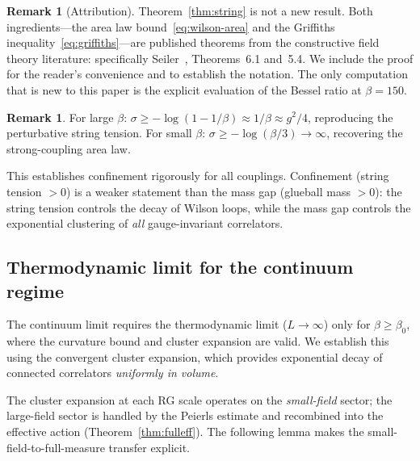 \documentclass[11pt]{article}
\theoremstyle{definition}
\newtheorem{remark}[theorem]{Remark}
\begin{document}
\begin{remark}[Attribution]
Theorem~\ref{thm:string} is not a new result.  Both
ingredients---the area law bound~\eqref{eq:wilson-area} and the
Griffiths inequality~\eqref{eq:griffiths}---are published
theorems from the constructive field theory literature:
specifically Seiler~\cite{Seiler82}, Theorems~6.1 and~5.4.
We include the proof for the reader's convenience and to
establish the notation.  The only computation that is new to
this paper is the explicit evaluation of the Bessel ratio at
$\beta=150$.
\end{remark}

\begin{remark}
For large $\beta$: $\sigma\ge-\log(1-1/\beta)\approx 1/\beta\approx
g^2/4$, reproducing the perturbative string tension.  For small $\beta$:
$\sigma\ge-\log(\beta/3)\to\infty$, recovering the strong-coupling area
law.
\end{remark}

This establishes confinement rigorously for all couplings.  Confinement
(string tension $>0$) is a weaker statement than the mass gap (glueball
mass $>0$): the string tension controls the decay of Wilson loops, while
the mass gap controls the exponential clustering of \emph{all}
gauge-invariant correlators.

\subsection{Thermodynamic limit for the continuum regime}

The continuum limit requires the thermodynamic limit ($L\to\infty$)
only for $\beta\ge\beta_0$, where the curvature bound and cluster
expansion are valid.  We establish this using the convergent
cluster expansion, which provides exponential decay of connected
correlators \emph{uniformly in volume}.

The cluster expansion at each RG scale operates on the
\emph{small-field} sector; the large-field sector is handled by
the Peierls estimate and recombined into the effective action
(Theorem~\ref{thm:fulleff}).  The following lemma makes the
small-field-to-full-measure transfer explicit.
\end{document}
